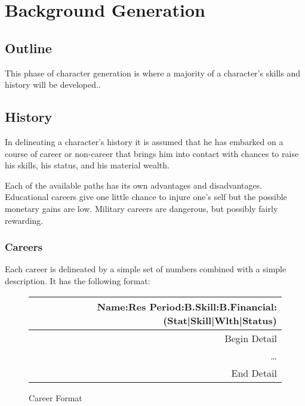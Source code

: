\chapter{Background Generation}

\section{Outline}

This phase of character generation is where a majority of a
character's skills and history will be developed..

\section{History}

In delineating a character's history it is assumed that he has embarked
on a course of career or non-career that brings him into contact with
chances to raise his skills, his status, and his material wealth.

Each of the available paths has its own advantages and disadvantages.
Educational careers give one little chance to injure one's self but the
possible monetary gains are low.  Military careers are dangerous, but
possibly fairly rewarding.

\subsection{Careers}
Each career is delineated by a simple set of numbers combined with a
simple description. It has the following format:

\begin{figure}[htb]
\caption{Career Format}
	\begin{tabular}{|r|} \hline
	Name:Res Period:B.Skill:B.Financial:(Stat|Skill|Wlth|Status)\\  \hline
	Begin Detail \\
	\dots \\
	End Detail \\ \hline
    \end{tabular}
\end{figure}

